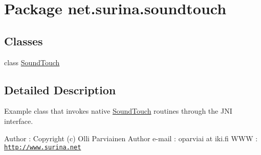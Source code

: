 \hypertarget{namespacenet_1_1surina_1_1soundtouch}{}\section{Package net.\+surina.\+soundtouch}
\label{namespacenet_1_1surina_1_1soundtouch}
\subsection*{Classes}
\begin{DoxyCompactItemize}
\item 
class \hyperlink{classnet_1_1surina_1_1soundtouch_1_1_sound_touch}{Sound\+Touch}
\end{DoxyCompactItemize}


\subsection{Detailed Description}
Example class that invokes native \hyperlink{classnet_1_1surina_1_1soundtouch_1_1_sound_touch}{Sound\+Touch} routines through the J\+NI interface.

Author \+: Copyright (c) Olli Parviainen Author e-\/mail \+: oparviai \textquotesingle{}at\textquotesingle{} iki.\+fi W\+WW \+: \href{http://www.surina.net}{\tt http\+://www.\+surina.\+net} 